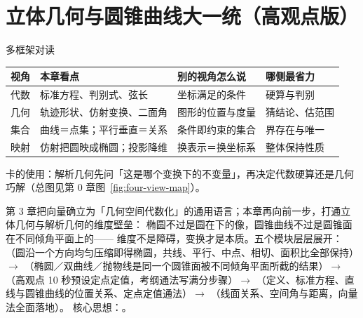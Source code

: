 
\section{立体几何与圆锥曲线大一统（高观点版）}

\begin{methodbox}{多框架对读}
\small
\begin{center}
\begin{tabular}{c|p{2.9cm}|p{5.0cm}|p{3.1cm}}
\toprule
视角 & 本章看点 & 别的视角怎么说 & 哪侧最省力 \\
\midrule
代数 & 标准方程、判别式、弦长 & 坐标满足的条件 & 硬算与判别 \\
几何 & 轨迹形状、仿射变换、二面角 & 图形的位置与度量 & 猜结论、估范围 \\
集合 & 曲线＝点集；平行垂直＝关系 & 条件即约束的集合 & 界存在与唯一 \\
映射 & 仿射把圆映成椭圆；投影降维 & 换表示＝换坐标系 & 整体保持性质 \\
\bottomrule
\end{tabular}
\end{center}
卡的使用：解析几何先问「这是哪个变换下的不变量」，再决定代数硬算还是几何巧解（总图见第 0 章图~\ref{fig:four-view-map}）。
\end{methodbox}

第 3 章把向量确立为「几何空间代数化」的通用语言；本章再向前一步，打通立体几何与解析几何的维度壁垒：
椭圆不过是圆在下的像，圆锥曲线不过是圆锥面在不同倾角平面上的——
维度不是障碍，变换才是本质。五个模块层层展开：
（圆沿一个方向均匀压缩即得椭圆，共线、平行、中点、相切、面积比全部保持）$\to$
（椭圆／双曲线／抛物线是同一个圆锥面被不同倾角平面所截的结果）$\to$
（高观点 10 秒预设定点定值，考纲通法写满分步骤）$\to$
（定义、标准方程、直线与圆锥曲线的位置关系、定点定值通法）$\to$
（线面关系、空间角与距离，向量法全面落地）。
核心思想：。

